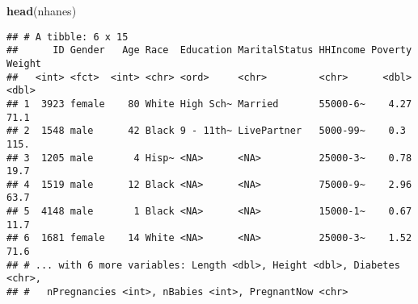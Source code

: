 \documentclass[]{article}
\newenvironment{Shaded}{\begin{snugshade}}{\end{snugshade}}
\newcommand{\KeywordTok}[1]{\textcolor[rgb]{0.13,0.29,0.53}{\textbf{#1}}}
\newcommand{\NormalTok}[1]{#1}
\begin{document}
\begin{Shaded}
\begin{Highlighting}[]
\KeywordTok{head}\NormalTok{(nhanes)}
\end{Highlighting}
\end{Shaded}

\begin{verbatim}
## # A tibble: 6 x 15
##      ID Gender   Age Race  Education MaritalStatus HHIncome Poverty Weight
##   <int> <fct>  <int> <chr> <ord>     <chr>         <chr>      <dbl>  <dbl>
## 1  3923 female    80 White High Sch~ Married       55000-6~    4.27   71.1
## 2  1548 male      42 Black 9 - 11th~ LivePartner   5000-99~    0.3   115. 
## 3  1205 male       4 Hisp~ <NA>      <NA>          25000-3~    0.78   19.7
## 4  1519 male      12 Black <NA>      <NA>          75000-9~    2.96   63.7
## 5  4148 male       1 Black <NA>      <NA>          15000-1~    0.67   11.7
## 6  1681 female    14 White <NA>      <NA>          25000-3~    1.52   71.6
## # ... with 6 more variables: Length <dbl>, Height <dbl>, Diabetes <chr>,
## #   nPregnancies <int>, nBabies <int>, PregnantNow <chr>
\end{verbatim}
\end{document}
